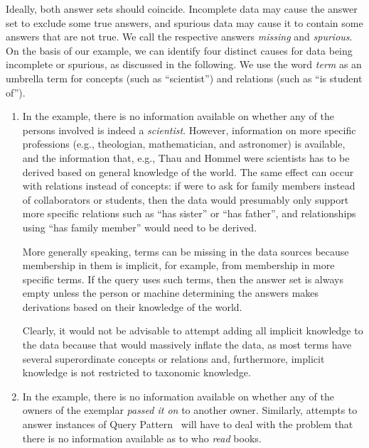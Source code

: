 Ideally, both answer sets should coincide.
Incomplete data may cause the answer set to exclude some true answers,
and spurious data may cause it to contain some answers that are not true.
We call the respective answers \emph{missing} and \emph{spurious}.
On the basis of our example, we can identify four distinct causes for data being incomplete or spurious,
as discussed in the following. We use the word \emph{term} as an umbrella term for concepts (such as \enquote{scientist})
and relations (such as \enquote{is student of}).
%
\begin{enumerate}
  \item
    In the example, there is no information available on whether any of the persons involved is indeed
    a \emph{scientist}.
    However, information on more specific professions (e.g., theologian,
    mathematician, and astronomer) is available, and the information that,
    e.g., Thau and Hommel were scientists has to be derived based on general knowledge
    of the world.
    The same effect can occur with relations instead of concepts:
    if  were to ask for family members instead of collaborators or students,
    then the data would presumably only support more specific relations
    such as \enquote{has sister} or \enquote{has father}, and relationships using
    \enquote{has family member} would need to be derived.

    More generally speaking, terms can be missing in the data sources
    because
    membership in them is implicit, for example, from membership in more specific terms.
    If the query uses such terms, then the answer set is always empty
    unless the person or machine determining the answers makes derivations based on their
    knowledge of the world.

    Clearly, it would not be advisable to attempt adding all implicit knowledge to the data
    because that would massively inflate the data,
    as most terms have several superordinate concepts or relations and,
    furthermore, implicit knowledge is not restricted to taxonomic knowledge.
  \item
    In the example, there is no information available on whether any of the owners of the exemplar
    \emph{passed it on} to another owner. Similarly,
    attempts to answer instances of Query Pattern~ will have to deal
    with the problem that there is no information available as to who \emph{read} books.
    

\end{enumerate}
